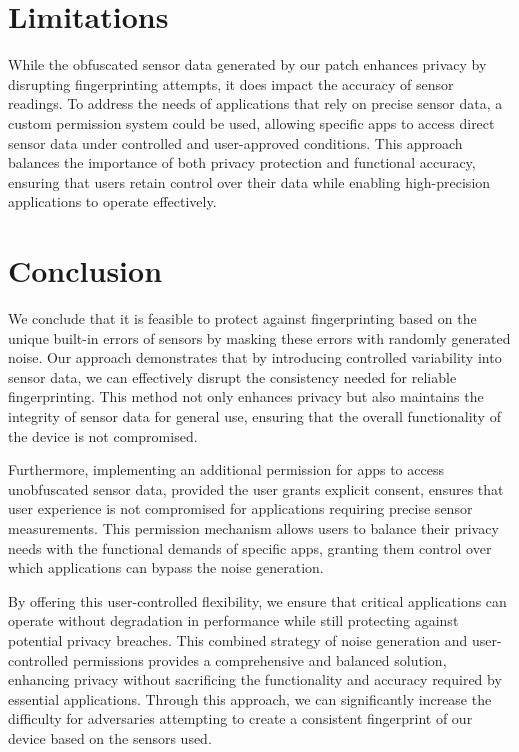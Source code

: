 \documentclass[11pt,
  oneside,openany,    %
]{scrreprt}
\begin{document}
\chapter{Limitations}
\label{chap:limitations}
While the obfuscated sensor data generated by our patch enhances privacy by disrupting fingerprinting attempts, it does impact the accuracy of sensor readings. 
To address the needs of applications that rely on precise sensor data, a custom permission system could be used, allowing specific apps to access direct sensor data under controlled and user-approved conditions. 
This approach balances the importance of both privacy protection and functional accuracy, ensuring that users retain control over their data while enabling high-precision applications to operate effectively.

\chapter{Conclusion}
\label{chap:conclusion}

We conclude that it is feasible to protect against fingerprinting based on the unique built-in errors of sensors by masking these errors with randomly generated noise.
Our approach demonstrates that by introducing controlled variability into sensor data, we can effectively disrupt the consistency needed for reliable fingerprinting. 
This method not only enhances privacy but also maintains the integrity of sensor data for general use, ensuring that the overall functionality of the device is not compromised.

Furthermore, implementing an additional permission for apps to access unobfuscated sensor data, provided the user grants explicit consent, ensures that user experience is not compromised for applications requiring precise sensor measurements.
This permission mechanism allows users to balance their privacy needs with the functional demands of specific apps, granting them control over which applications can bypass the noise generation.

By offering this user-controlled flexibility, we ensure that critical applications can operate without degradation in performance while still protecting against potential privacy breaches.
This combined strategy of noise generation and user-controlled permissions provides a comprehensive and balanced solution, enhancing privacy without sacrificing the functionality and accuracy required by essential applications. 
Through this approach, we can significantly increase the difficulty for adversaries attempting to create a consistent fingerprint of our device based on the sensors used. 
\end{document}
